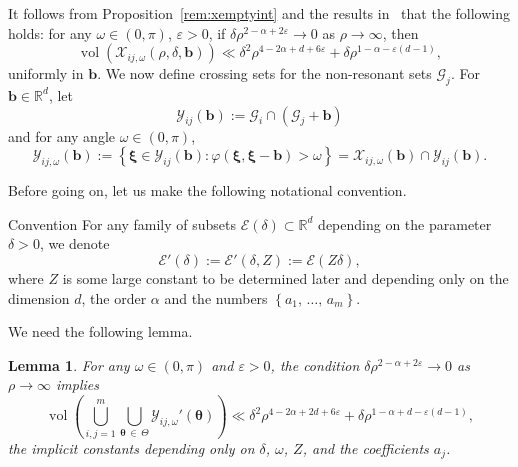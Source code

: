 \documentclass[10pt]{amsart}
\newtheorem{lemm}[theo]{Lemma}\newtheorem{prop}[theo]{Proposition}\newtheorem{coro}[theo]{Corollary}\newtheorem{conj}[theo]{Conjecture}
\theoremstyle{definition}\newtheorem{defi}[theo]{Definition}\newtheorem{rema}[theo]{Remark}\newtheorem{exam}[theo]{Example}\newtheorem{nota}[theo]{Notation}
\DeclareMathOperator{\vol}{vol}
\newcommand{\R}{\mathbb R}
\newcommand{\CE}{\mathcal{E}}
\newcommand{\CG}{\mathcal{G}}
\newcommand{\CX}{\mathcal{X}}
\newcommand{\CY}{\mathcal{Y}}
\newcommand{\btheta}{\boldsymbol \theta}
\newcommand{\bxi}{\boldsymbol \xi}
\newcommand{\bb}{\mathbf b}
\newcommand{\bbb}{\mathbf b}
\renewcommand{\phi}{\varphi}
\newcommand{\eps}{\varepsilon}
\newcommand{\set}[1]{\left\{ #1 \right\}}
\begin{document}
It follows from Proposition~\ref{rem:xemptyint} and the results in~\cite[Section~9]{ParSob2010} that the following holds: for any $\omega \in (0,\pi)$, $\eps > 0$, if $\delta \rho^{2 - \alpha + 2 \eps} \to 0$ as $\rho \to \infty$, then
\begin{equation}\label{eq:nokissmu}
\vol\left(\CX_{ij,\omega}(\rho,\delta,\bb)\right) \ll \delta^2 \rho^{4 - 2\alpha + d + 6\eps} + \delta \rho^{1 - \alpha - \eps(d-1)},
\end{equation}
uniformly in $\bb$. We now define crossing sets for the non-resonant sets $\CG_j$. For $\bbb \in
\R^d$, let
\begin{equation}
\CY_{ij}(\bb) := \CG_{i} \cap (\CG_j +
\bb)
\end{equation}
and for any angle $\omega \in (0,\pi)$,
\begin{equation}
\CY_{ij,\omega}(\bb) := \set{\bxi \in \CY_{ij}(\bbb) : \phi(\bxi,\bxi-\bb) > \omega} = \CX_{ij,\omega}(\bbb) \cap \CY_{ij}(\bbb).
\end{equation}

Before going on, let us make the following notational convention.

\begin{enonce*}
{Convention}
For any family of subsets $\CE(\delta) \subset \R^d$ depending on the parameter $\delta > 0$, we denote
\[
\CE'(\delta) := \CE'(\delta,Z) := \CE(Z\delta),
\]
where $Z$ is some large constant to be determined later and depending only on the dimension $d$, the order $\alpha$ and the numbers $\set{a_1,\,\dotsc,\,a_m}$.
\end{enonce*}

We need the following lemma.
\begin{lemm} \label{lem:totalintersection}
For any $\omega \in (0,\pi)$ and $\eps > 0$, the condition $\delta \rho^{2 -
\alpha + 2\eps} \to 0$ as $\rho \to \infty$ implies
\begin{equation}
\vol\left(\bigcup_{i,j = 1}^m \bigcup_{\btheta\,\in\,\Theta}
\CY_{ij,\omega}'(\btheta) \right) \ll
\delta^2 \rho^{4 - 2\alpha + 2 d +6\eps} + \delta \rho^{1- \alpha + d - \eps(d-1)},\label{eq:sobranie}
\end{equation}
the implicit constants depending only on $\delta$, $\omega$, $Z$, and the coefficients $a_j$.
\end{lemm}
\end{document}
